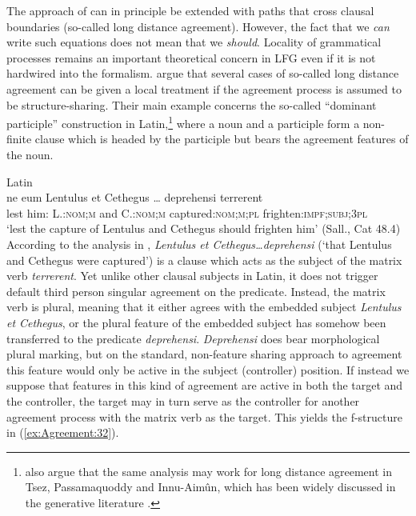 \documentclass[output=paper,hidelinks]{langscibook}
\begin{document}
The approach of \citet{sadler16} can in principle be extended with
paths that cross clausal boundaries (so-called long distance
agreement). However, the fact that we \emph{can} write such equations does not mean
that we \emph{should}. Locality of grammatical processes remains an important
theoretical concern in LFG even if it is not hardwired into the
formalism. \citet{haug-nikitina2015} argue that several cases of
so-called long distance agreement can be given a local treatment if
the agreement process is assumed to be structure-sharing. Their main
example concerns the so-called ``dominant participle'' construction in
Latin,\footnote{\citet{haug-nikitina2015} also argue that the same analysis may work for long distance agreement in Tsez, Passamaquoddy and Innu-Aimûn, which has been widely discussed in the generative literature \citep{Branigan:Altruism,Bruening:PhD,Polinsky2001:Agreement}.} where a noun and a participle form a non-finite clause which is
headed by the participle but bears the agreement features of the noun.

\newpage
\ea\label{subjectdom2} Latin\\
\gll ne eum Lentulus et Cethegus {\dots} deprehensi terrerent\\
lest him:{\ACC} L.:\textsc{nom;m} and C.:\textsc{nom;m} {} captured:\textsc{nom;m;pl} frighten:\textsc{impf;subj;3pl}\\
\glt`lest the capture of Lentulus and Cethegus should frighten him' (Sall., Cat 48.4)
\z
According to the analysis in \citet{haug-nikitina2015},
\textit{Lentulus et Cethegus\dots de\-pre\-hensi} (`that Lentulus and
Cethegus were captured') is a clause which acts as the subject of the
matrix verb \textit{terrerent}. Yet unlike other clausal subjects in
Latin, it does not trigger default third person singular agreement on the
predicate. Instead, the matrix verb is plural, meaning that it either
agrees with the embedded subject \textit{Lentulus et Cethegus}, or the
plural feature of the embedded subject has somehow been transferred
to the predicate \textit{deprehensi}. \textit{Deprehensi} does bear
morphological plural marking, but on the standard, non-feature sharing
approach to agreement this feature would only be active in the 
subject (controller) position. If instead we suppose that features
in this kind of agreement are active in both the target and the
controller, the target may in turn serve as the controller for another
agreement process with the matrix verb as the target. This yields the
f-structure in (\ref{ex:Agreement:32}).
\end{document}
